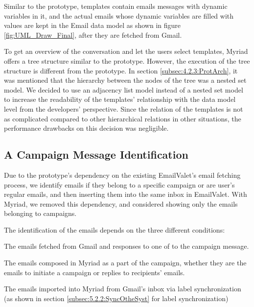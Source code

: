 Similar to the prototype, templates contain emails messages with dynamic variables in it, and the actual emails whose dynamic variables are filled with values are kept in the Email data model as shown in figure \ref{fig:UML_Draw_Final}, after they are fetched from Gmail.
\vspace{1cm}

To get an overview of the conversation and let the users select templates, Myriad offers a tree structure similar to the prototype. However, the execution of the tree structure is different from the prototype. In section \ref{subsec:4.2.3:ProtArch}, it was mentioned that the hierarchy between the nodes of the tree was a nested set model. We decided to use an adjacency list model instead of a nested set model to increase the readability of the templates' relationship with the data model level from the developers' perspective. Since the relation of the templates is not as complicated compared to other hierarchical relations in other situations, the performance drawbacks on this decision was negligible.

\subsection{A Campaign Message Identification}
\label{subsec:5.3.3:MessIden}

Due to the prototype's dependency on the existing EmailValet's email fetching process, we identify emails if they belong to a specific campaign or are user's regular emails, and then inserting them into the same inbox in EmailValet. With Myriad, we removed this dependency, and considered showing only the emails belonging to campaigns.
\vspace{1cm}

The identification of the emails depends on the three different conditions:

\begin{compactenum}
	\item The emails fetched from Gmail and responses to one of to the campaign message.
	\item The emails composed in Myriad as a part of the campaign, whether they are the emails to initiate a campaign or replies to recipients' emails.
	\item The emails imported into Myriad from Gmail's inbox via label synchronization (as shown in section \ref{subsec:5.2.2:SyncOtheSyst} for label synchronization)
\end{compactenum}

